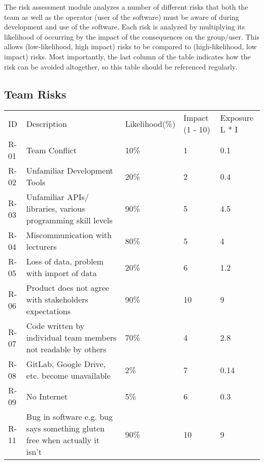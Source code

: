 The risk assessment module analyzes a number of different risks that both the team as well as the operator (user of the software) must be aware of during development and use of the software. Each risk is analyzed by multiplying its likelihood of occurring by the impact of the consequences on the group/user. This allows (low-likelihood, high impact) risks to be compared to (high-likelihood, low impact) risks. Most importantly, the last column of the table indicates how the risk can be avoided altogether, so this table should be referenced regularly.

\subsection{Team Risks}

\begin{tabularx}{\linewidth}{|X|X|X|X|X|}
    ID & Description & Likelihood(\%) & Impact (1 - 10) & Exposure L * I \\
    R-01 & Team Conflict & 10\% & 1 & 0.1 \\
    R-02 & Unfamiliar Development Tools & 20\% & 2 & 0.4 \\
    R-03 & Unfamiliar APIs/ libraries, various programming skill levels & 90\% & 5 & 4.5 \\
    R-04 & Miscommunication with lecturers & 80\% & 5 & 4 \\
    R-05 & Loss of data, problem with import of data & 20\% & 6 & 1.2 \\
    R-06 & Product does not agree with stakeholders expectations & 90\% & 10 & 9 \\
    R-07 & Code written by individual team members not readable by others & 70\% & 4 & 2.8 \\
    R-08 & GitLab, Google Drive, etc. become unavailable & 2\% & 7 & 0.14 \\
    R-09 & No Internet & 5\% & 6 & 0.3 \\
    R-11 & Bug in software e.g. bug says something gluten free when actually it isn’t & 90\% & 10 & 9 \\
\end{tabularx}


